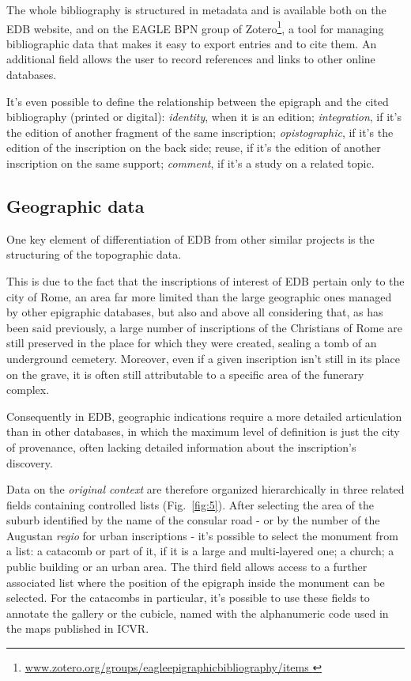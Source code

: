 \documentclass[amsthm,ebook]{saparticle}
\begin{document}
The whole bibliography is structured in metadata and is available both on the EDB website, and on the EAGLE BPN group of
Zotero\footnote{ \url{www.zotero.org/groups/eagleepigraphicbibliography/items }}, a tool for managing bibliographic data that
makes it easy to export entries and to cite them. An additional field allows the user to record references and links to
other online databases. 

It's even possible to define the relationship between the epigraph and the cited bibliography (printed or digital):
\emph{identity}, when it is an edition; \emph{integration}, if it's the edition of another fragment of the same inscription;
\emph{opistographic}, if it's the edition of the inscription on the back side; reuse, if it's the edition of another
inscription on the same support; \emph{comment}, if it's a study on a related topic.




\subsection{Geographic data}


One key element of differentiation of EDB from other similar projects is the structuring of the topographic data. 

This is due to the fact that the inscriptions of interest of EDB pertain only to the city of Rome, an area far more
limited than the large geographic ones managed by other epigraphic databases, but also and above all considering that,
as has been said previously, a large number of inscriptions of the Christians of Rome are still preserved in the place
for which they were created, sealing a tomb of an underground cemetery. Moreover, even if a given inscription isn't
still in its place on the grave, it is often still attributable to a specific area of the funerary complex.

Consequently in EDB, geographic indications require a more detailed articulation than in other databases, in which the
maximum level of definition is just the city of provenance, often lacking detailed information about the inscription’s
discovery.

Data on the \emph{original context} are therefore organized hierarchically in three related fields containing controlled lists (Fig.~\ref{fig:5}). 
After selecting the area of the suburb identified by the name of the consular road - or by the number of the Augustan
\emph{regio} for urban inscriptions - it's possible to select the monument from a list: a catacomb or part of it, if it is a
large and multi-layered one; a church; a public building or an urban area. The third field allows access to a further
associated list where the position of the epigraph inside the monument can be selected. For the catacombs in
particular, it’s possible to use these fields to annotate the gallery or the cubicle, named with the alphanumeric code
used in the maps published in ICVR.
\end{document}
